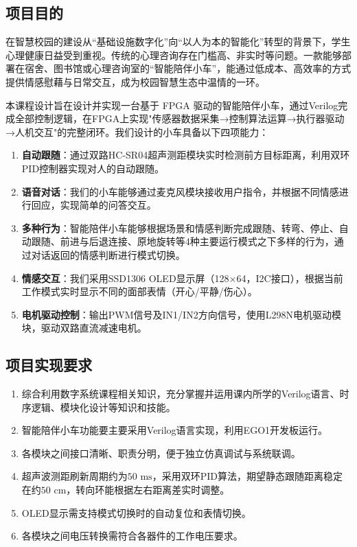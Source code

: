 \documentclass[12pt,a4paper]{ctexart}
\begin{document}
\subsection{项目目的}
在智慧校园的建设从“基础设施数字化”向“以人为本的智能化”转型的背景下，学生心理健康日益受到重视。传统的心理咨询存在门槛高、非实时等问题。一款能够部署在宿舍、图书馆或心理咨询室的“智能陪伴小车”，能通过低成本、高效率的方式提供情感慰藉与日常交互，成为校园智慧生态中温情的一环。

本课程设计旨在设计并实现一台基于 FPGA 驱动的智能陪伴小车，通过Verilog完成全部控制逻辑，在FPGA上实现"传感器数据采集→控制算法运算→执行器驱动→人机交互"的完整闭环。我们设计的小车具备以下四项能力：

\begin{enumerate}[label=(\arabic*)]
    \item \textbf{自动跟随}：通过双路HC-SR04超声测距模块实时检测前方目标距离，利用双环PID控制器实现对人的自动跟随。
    \item \textbf{语音对话}：我们的小车能够通过麦克风模块接收用户指令，并根据不同情感进行回应，实现简单的问答交互。
    \item \textbf{多种行为}：智能陪伴小车能够根据场景和情感判断完成跟随、转弯、停止、自动跟随、前进与后退连接、原地旋转等4种主要运行模式之下多样的行为，通过对话返回的情感判断进行模式切换。
    \item \textbf{情感交互}：我们采用SSD1306 OLED显示屏（128$\times$64，I2C接口），根据当前工作模式实时显示不同的面部表情（开心/平静/伤心）。
    \item \textbf{电机驱动控制}：输出PWM信号及IN1/IN2方向信号，使用L298N电机驱动模块，驱动双路直流减速电机。
\end{enumerate}

\subsection{项目实现要求}

\begin{enumerate}[label=(\arabic*)]
    \item 综合利用数字系统课程相关知识，充分掌握并运用课内所学的Verilog语言、时序逻辑、模块化设计等知识和技能。
    \item 智能陪伴小车功能要主要采用Verilog语言实现，利用EGO1开发板运行。
    \item 各模块之间接口清晰、职责分明，便于独立仿真调试与系统联调。
    \item 超声波测距刷新周期约为$50\text{ ms}$，采用双环PID算法，期望静态跟随距离稳定在约$50\text{ cm}$，转向环能根据左右距离差实时调整。
    \item OLED显示需支持模式切换时的自动复位和表情切换。
    \item 各模块之间电压转换需符合各器件的工作电压要求。
\end{enumerate}
\end{document}
